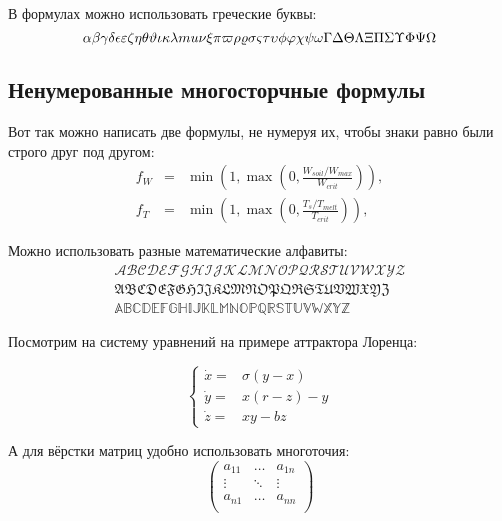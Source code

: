 В формулах можно использовать греческие буквы:
$$
\alpha\beta\gamma\delta\epsilon\varepsilon\zeta\eta\theta\vartheta\iota\kappa\lambda\\mu\nu\xi\pi\varpi\rho\varrho\sigma\varsigma\tau\upsilon\phi\varphi\chi\psi\omega\Gamma\Delta\Theta\Lambda\Xi\Pi\Sigma\Upsilon\Phi\Psi\Omega
$$


\subsection{Ненумерованные многосторчные формулы} \label{subsect1_3_2}

Вот так можно написать две формулы, не нумеруя их, чтобы знаки равно были строго друг под другом:
\begin{eqnarray}
  f_W & = & \min \left( 1, \max \left( 0, \frac{W_{soil} / W_{max}}{W_{crit}} \right)  \right), \nonumber \\
  f_T & = & \min \left( 1, \max \left( 0, \frac{T_s / T_{melt}}{T_{crit}} \right)  \right), \nonumber
\end{eqnarray}

Можно использовать разные математические алфавиты:
\begin{eqnarray}
\mathcal{ABCDEFGHIJKLMNOPQRSTUVWXYZ} \nonumber \\
\mathfrak{ABCDEFGHIJKLMNOPQRSTUVWXYZ} \nonumber \\
\mathbb{ABCDEFGHIJKLMNOPQRSTUVWXYZ} \nonumber
\end{eqnarray}

Посмотрим на систему уравнений на примере аттрактора Лоренца:

$$
\left\{
  \begin{array}{rl}
    \dot x = & \sigma (y-x) \\
    \dot y = & x (r - z) - y \\
    \dot z = & xy - bz
  \end{array}
\right.
$$

А для вёрстки матриц удобно использовать многоточия:
$$
\left(
  \begin{array}{ccc}
  	a_{11} & \ldots & a_{1n} \\
  	\vdots & \ddots & \vdots \\
  	a_{n1} & \ldots & a_{nn} \\
  \end{array}
\right)
$$


